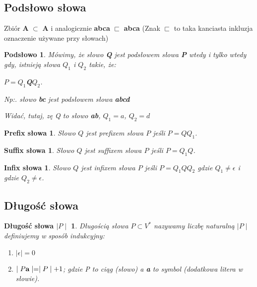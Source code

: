 \subsection{Podsłowo słowa}
Zbiór { \bf A } $\subset$   { \bf A } i analogicznie  { \bf abca } $\sqsubset$  { \bf abca }
(Znak $\sqsubset$  to taka kanciasta inkluzja oznaczenie używane przy słowach)


\newtheorem*{theorem9*}{Podsłowo}
\begin{theorem9*}
Mówimy, że słowo {\bf Q} jest podsłowem słowa {\bf P} wtedy i tylko wtedy gdy, istnieją słowa $Q_{1}$ i $Q_{2}$ takie, że:
\begin{center}
$P = Q_{1}${\bf Q}$Q_{2}$.
\end{center}
Np:. słowo {\bf bc} jest podsłowem słowa {\bf abcd} 


\begin{center}
\end{center}

Widać, tutaj, zę Q to słowo {\bf ab}, $Q_{1} = a$, $Q_{2}=d$
\end{theorem9*}
 

\newtheorem*{theorem10*}{Prefix słowa}
\begin{theorem10*}
Słowo $Q$ jest prefixem słowa $P$ jeśli $P = QQ_{1}$.
\end{theorem10*}
 
\newtheorem*{theorem11*}{Suffix słowa}
\begin{theorem11*}
Słowo $Q$ jest suffixem słowa $P$ jeśli $P =Q_{1}Q$.
\end{theorem11*}

\newtheorem*{theorem12*}{Infix słowa}
\begin{theorem12*}
Słowo $Q$ jest infixem słowa $P$ jeśli $P =Q_{1}QQ_{2}$  \newline
gdzie $Q_{1}\neq \epsilon$ i gdzie $Q_{2} \neq \epsilon$.
\end{theorem12*}



\subsection{Długość słowa}
\newtheorem*{theorem13*}{Długość słowa $\mid P\mid$}
\begin{theorem13*}
Długością słowa $P \subset V^{*}$ nazywamy liczbę naturalną $\mid P\mid$ definiujemy w sposób indukcyjny:
 
\begin{enumerate}[label=(\roman*)]
  \item $ \mid  \epsilon \mid=0$
  \item $ \mid P{ \bf a}  \mid= \mid P \mid + 1$; gdzie P to ciąg (słowo) a {\bf a} to symbol (dodatkowa litera w słowie).
\end{enumerate} 
 
\end{theorem13*}




